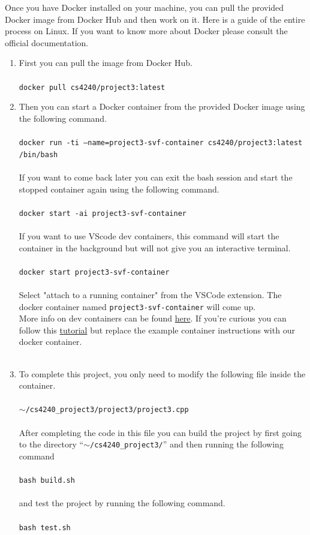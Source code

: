 \documentclass[12pt]{article}
\newcommand{\codeIn}[1]{{\small\tt{#1}}}
\begin{document}
Once you have Docker installed on your machine, you can pull the provided Docker image from Docker Hub and then work on it. Here is a guide of the entire process on Linux. If you want to know more about Docker please consult the official documentation.

\begin{enumerate}
    \item First you can pull the image from Docker Hub.\\\\
    \codeIn{docker pull cs4240/project3:latest}\\
    \item Then you can start a Docker container from the provided Docker image using the following command.\\\\
    \codeIn{docker run -ti --name=project3-svf-container cs4240/project3:latest /bin/bash}\\\\
    If you want to come back later you can exit the bash session and start the stopped container again using the following command.\\\\
    \codeIn{docker start -ai project3-svf-container}\\\\
    If you want to use VScode dev containers, this command will start the container in the background but will not give you an interactive terminal.\\\\
    \codeIn{docker start project3-svf-container}\\\\
    Select "attach to a running container" from the VSCode extension.
    The docker container named \codeIn{project3-svf-container} will come up. \\
    More info on dev containers can be found \href{https://code.visualstudio.com/docs/devcontainers/containers}{here}. If you're curious you can follow this \href{https://code.visualstudio.com/docs/devcontainers/tutorial}{tutorial} but replace the example container instructions with our docker container.\\\\
    \item To complete this project, you only need to modify the following file inside the container.\\\\
    \codeIn{$\sim$/cs4240\_project3/project3/project3.cpp}\\\\
    After completing the code in this file you can build the project by first going to the directory ``\codeIn{$\sim$/cs4240\_project3/}'' and then running the following command\\\\
    \codeIn{bash build.sh}\\\\
    and test the project by running the following command.\\\\
    \codeIn{bash test.sh}
\end{enumerate}
\end{document}
